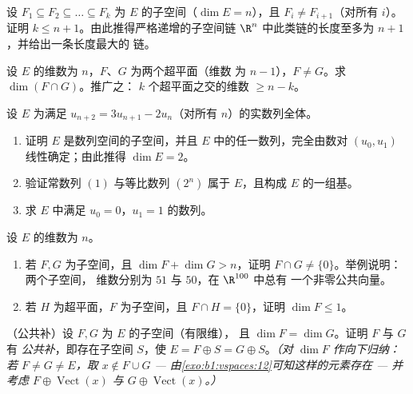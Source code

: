 \begin{exercise}[$\star\star\star$]\label{exo:b1:findim:8}
设 $F_1 \subseteq F_2 \subseteq \dots \subseteq F_k$ 为
$E$ 的子空间（$\dim E = n$），且 $F_i \neq F_{i+1}$（对所有 $i$）。证明 $k
\leq n + 1$。由此推得严格递增的子空间链
$\R^n$ 中此类链的长度至多为 $n + 1$，并给出一条长度最大的
链。
\end{exercise}

\begin{exercise}[$\star\star\star$]\label{exo:b1:findim:9}
设 $E$ 的维数为 $n$，$F$、$G$ 为两个超平面（维数
为 $n - 1$），$F \neq G$。求 $\dim(F \cap G)$。推广之：
$k$ 个超平面之交的维数 $\geq n - k$。
\end{exercise}

\begin{exercise}[$\star\star$]\label{exo:b1:findim:10}
设 $E$ 为满足 $u_{n+2} =
3u_{n+1} - 2u_n$（对所有 $n$）的实数列全体。
\begin{enumerate}
  \item 证明 $E$ 是数列空间的子空间，并且
        $E$ 中的任一数列，完全由数对
        $(u_0, u_1)$ 线性确定；由此推得 $\dim E = 2$。
  \item 验证常数列 $(1)$ 与等比数列
        $(2^n)$ 属于 $E$，且构成 $E$ 的一组基。
  \item 求 $E$ 中满足 $u_0 = 0$，$u_1 = 1$ 的数列。
\end{enumerate}
\end{exercise}

\begin{exercise}[$\star\star$]\label{exo:b1:findim:11}
设 $E$ 的维数为 $n$。
\begin{enumerate}
  \item 若 $F, G$ 为子空间，且 $\dim F + \dim G > n$，证明
        $F \cap G \neq \{0\}$。举例说明：两个子空间，
        维数分别为 $51$ 与 $50$，在 $\R^{100}$ 中总有
        一个非零公共向量。
  \item 若 $H$ 为超平面，$F$ 为子空间，且 $F \cap H =
        \{0\}$，证明 $\dim F \leq 1$。
\end{enumerate}
\end{exercise}

\begin{exercise}[$\star\star\star$]\label{exo:b1:findim:12}
（公共补）设 $F, G$ 为 $E$ 的子空间（有限维），
且 $\dim F = \dim G$。证明 $F$ 与 $G$ 有
\emph{公共补}，即存在子空间 $S$，使 $E = F
\oplus S = G \oplus S$。\emph{（对 $\dim F$ 作向下归纳：若 $F
\neq G \neq E$，取 $x \notin F \cup G$ ---
由\cref{exo:b1:vspaces:12}可知这样的元素存在 --- 并考虑 $F \oplus
\operatorname{Vect}(x)$ 与 $G \oplus \operatorname{Vect}(x)$。）}
\end{exercise}

